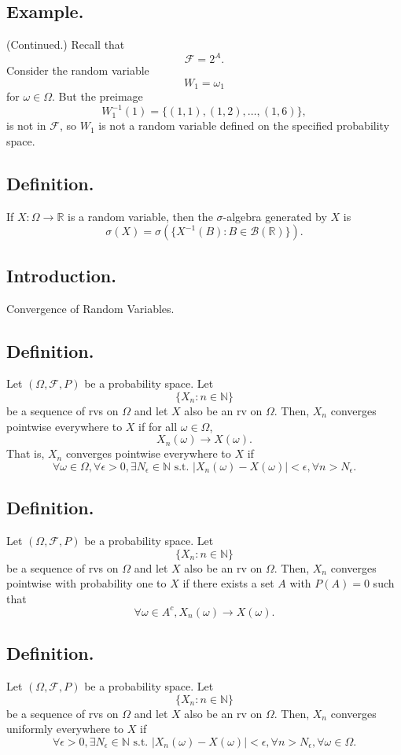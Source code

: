 \documentclass[titlepage]{article}
\begin{document}
\subsection{Example.} (Continued.) Recall that 
$$\mathcal{F} = 2^{A}.$$
Consider the random variable $$W_{1} = \omega_{1}$$
for $\omega \in \Omega$. But the preimage 
$$W_{1}^{-1}(1) = \{(1, 1), (1, 2), \ldots, (1, 6)\},$$
is not in $\mathcal{F}$, so $W_{1}$ is not a random variable defined on the specified probability space.

\subsection{Definition.} If $X: \Omega \to \mathbb{R}$ is a random variable, then the $\sigma$-algebra generated by $X$ is 
$$\sigma(X) = \sigma\left(\{X^{-1}(B): B \in \mathcal{B}(\mathbb{R})\}\right).$$

\newpage {}

\subsection{Introduction.} Convergence of Random Variables.

\subsection{Definition.} Let $(\Omega, \mathcal{F}, P)$ be a probability space. Let 
$$\{X_{n}: n \in \mathbb{N}\}$$
be a sequence of rvs on $\Omega$ and let $X$ also be an rv on $\Omega$. Then, $X_{n}$ converges pointwise everywhere to $X$ if for all $\omega \in \Omega$,
$$X_{n}(\omega) \to X(\omega).$$
That is, $X_{n}$ converges pointwise everywhere to $X$ if 
$$\forall \omega \in \Omega, \forall \epsilon > 0, \exists N_{\epsilon} \in \mathbb{N} \text{ s.t. } |X_{n}(\omega) - X(\omega)| < \epsilon, \forall n > N_{\epsilon}.$$

\subsection{Definition.} Let $(\Omega, \mathcal{F}, P)$ be a probability space. Let 
$$\{X_{n}: n \in \mathbb{N}\}$$
be a sequence of rvs on $\Omega$ and let $X$ also be an rv on $\Omega$. Then, $X_{n}$ converges pointwise with probability one to $X$ if there exists a set $A$ with $P(A) = 0$ such that 
$$\forall \omega \in A^{c}, X_{n}(\omega) \to X(\omega).$$

\subsection{Definition.} Let $(\Omega, \mathcal{F}, P)$ be a probability space. Let
$$\{X_{n}: n \in \mathbb{N}\}$$
be a sequence of rvs on $\Omega$ and let $X$ also be an rv on $\Omega$. Then, $X_{n}$ converges uniformly everywhere to $X$ if 
$$\forall \epsilon > 0, \exists N_{\epsilon} \in \mathbb{N} \text{ s.t. } |X_{n}(\omega) - X(\omega)| < \epsilon, \forall n > N_{\epsilon}, \forall \omega \in \Omega.$$ 
\end{document}
